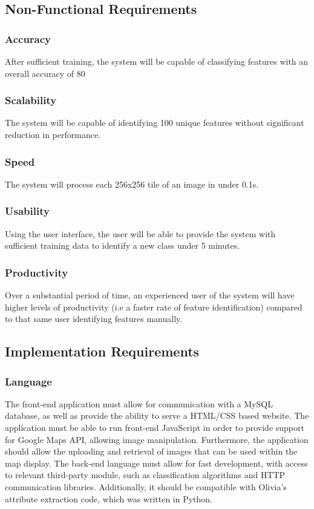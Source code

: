 \subsection{Non-Functional Requirements} \label{nonfuncreqs}
\subsubsection{Accuracy}
After sufficient training, the system will be capable of classifying features with an overall accuracy of 80%
\subsubsection{Scalability}
The system will be capable of identifying 100 unique features without significant reduction in performance.
\subsubsection{Speed}
The system will process each 256x256 tile of an image in under 0.1s.
\subsubsection{Usability}
Using the user interface, the user will be able to provide the system with sufficient training data to identify a new class under 5 minutes.
\subsubsection{Productivity}
Over a substantial period of time, an experienced user of the system will have higher levels of productivity (i.e a faster rate of feature identification) compared to that same user identifying features manually.

\subsection{Implementation Requirements} \label{impreqs}
\subsubsection{Language}
 \label{frontendlang}
The front-end application must allow for communication with a MySQL database, as well as provide the ability to serve a HTML/CSS based website. The application must be able to run front-end JavaScript in order to provide support for Google Maps API, allowing image manipulation. Furthermore, the application should allow the uploading and retrieval of images that can be used within the map display. 
The back-end language must allow for fast development, with access to relevant third-party module, such as classification algorithms and HTTP communication libraries. Additionally, it should be compatible with Olivia’s attribute extraction code, which was written in Python.
